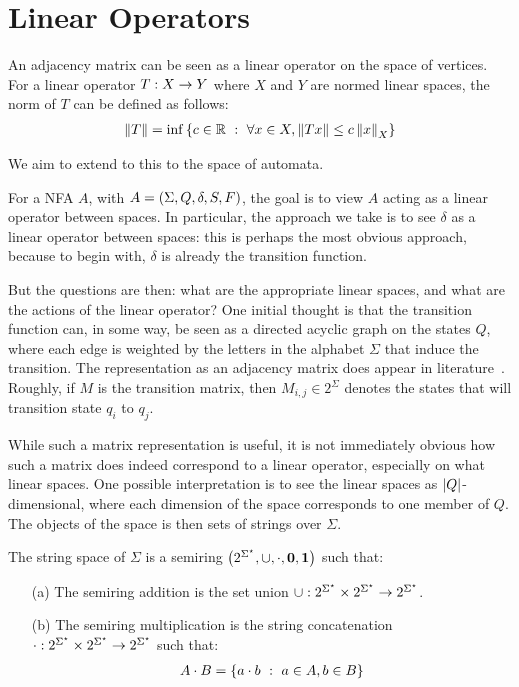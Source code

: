 
\section{Linear Operators}

An adjacency matrix can be seen as a linear operator on the space of
vertices.
For a linear operator \(T : X \to Y\) where \(X\) and \(Y\)
are normed linear spaces, the norm of \(T\) can be defined
as follows:
\begin{align*}
  \left\lVert T\right\rVert
    = \inf\left\{c \in \mathbb{R} \  : \ 
              \forall x \in X, \left\lVert Tx\right\rVert \leq c \left\lVert x\right\rVert_X\right\}
\end{align*}

We aim to extend to this to the space of automata.

For a NFA \(A\), with \(A = \left(\Sigma, Q, \delta, S, F\right)\),
the goal is to view \(A\) acting as a linear operator between spaces.
In particular, the approach we take is to see \(\delta\) as a
linear operator between spaces: this is perhaps the most obvious approach,
because to begin with, \(\delta\) is already the transition function.

But the questions are then:
what are the appropriate linear spaces,
and what are the actions of the linear operator?
One initial thought is that the transition function can, in some way,
be seen as a directed acyclic graph on the states \(Q\),
where each edge is weighted by the letters in the alphabet \(\Sigma\)
that induce the transition.
The representation as an adjacency matrix does appear in
literature~\cite{savage1998models}.
Roughly, if \(M\) is the transition matrix, then \(M_{i, j} \in 2^{\Sigma}\)
denotes the states that will transition state \(q_i\) to \(q_j\).

While such a matrix representation is useful,
it is not immediately obvious how such a matrix does indeed correspond
to a linear operator, especially on what linear spaces.
One possible interpretation is to see
the linear spaces as \(\left\lvert Q\right\rvert\)-dimensional,
where each dimension of the space corresponds to one member of \(Q\).
The objects of the space is then sets of strings over \(\Sigma\).

\begin{definition}
  The string space of \(\Sigma\) is a semiring
  \(\left(2^{\Sigma^\star}, \cup, \cdot, \mathbf{0}, \mathbf{1}\right)\)
  such that:
  \begin{enumerate}
    \item[(a)]
      The semiring addition is the set union
      \(\cup : 2^{\Sigma^\star} \times
        2^{\Sigma^\star} \to 2^{\Sigma^\star}\).

    \item[(b)]
      The semiring multiplication is the string concatenation
      \(\cdot : 2^{\Sigma^\star} \times
        2^{\Sigma^\star} \to 2^{\Sigma^\star}\)
      such that:
      \begin{align*}
        A \cdot B
          = \left\{a \cdot b \  : \  a \in A, b \in B\right\}
      \end{align*}
  \end{enumerate}
\end{definition}

